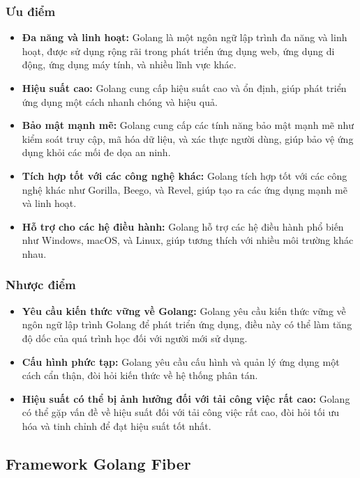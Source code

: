 \subsubsection{Ưu điểm}
\begin{itemize}
  \item \textbf{Đa năng và linh hoạt:} Golang là một ngôn ngữ lập trình đa năng và linh hoạt, được sử dụng rộng rãi trong phát triển ứng dụng web, ứng dụng di động, ứng dụng máy tính, và nhiều lĩnh vực khác.
  \item \textbf{Hiệu suất cao:} Golang cung cấp hiệu suất cao và ổn định, giúp phát triển ứng dụng một cách nhanh chóng và hiệu quả.
  \item \textbf{Bảo mật mạnh mẽ:} Golang cung cấp các tính năng bảo mật mạnh mẽ như kiểm soát truy cập, mã hóa dữ liệu, và xác thực người dùng, giúp bảo vệ ứng dụng khỏi các mối đe dọa an ninh.
  \item \textbf{Tích hợp tốt với các công nghệ khác:} Golang tích hợp tốt với các công nghệ khác như Gorilla, Beego, và Revel, giúp tạo ra các ứng dụng mạnh mẽ và linh hoạt.
  \item \textbf{Hỗ trợ cho các hệ điều hành:} Golang hỗ trợ các hệ điều hành phổ biến như Windows, macOS, và Linux, giúp tương thích với nhiều môi trường khác nhau.
\end{itemize}
\subsubsection{Nhược điểm}
\begin{itemize}
  \item \textbf{Yêu cầu kiến thức vững về Golang:} Golang yêu cầu kiến thức vững về ngôn ngữ lập trình Golang để phát triển ứng dụng, điều này có thể làm tăng độ dốc của quá trình học đối với người mới sử dụng.
  \item \textbf{Cấu hình phức tạp:} Golang yêu cầu cấu hình và quản lý ứng dụng một cách cẩn thận, đòi hỏi kiến thức về hệ thống phân tán.
  \item \textbf{Hiệu suất có thể bị ảnh hưởng đối với tải công việc rất cao:} Golang có thể gặp vấn đề về hiệu suất đối với tải công việc rất cao, đòi hỏi tối ưu hóa và tinh chỉnh để đạt hiệu suất tốt nhất.
\end{itemize}
\subsection{Framework Golang Fiber}
